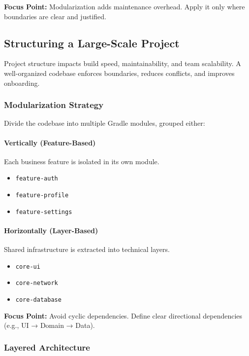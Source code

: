 \documentclass[a4paper,12pt]{article}
\begin{document}
\textbf{Focus Point:} Modularization adds maintenance overhead. Apply it only where boundaries are clear and justified.

\subsection{Structuring a Large-Scale Project}

Project structure impacts build speed, maintainability, and team scalability. A well-organized codebase enforces boundaries, reduces conflicts, and improves onboarding.

\subsubsection{Modularization Strategy}

Divide the codebase into multiple Gradle modules, grouped either:

\paragraph{Vertically (Feature-Based)}

Each business feature is isolated in its own module.

\begin{itemize}
  \item \texttt{feature-auth}
  \item \texttt{feature-profile}
  \item \texttt{feature-settings}
\end{itemize}

\paragraph{Horizontally (Layer-Based)}

Shared infrastructure is extracted into technical layers.

\begin{itemize}
  \item \texttt{core-ui}
  \item \texttt{core-network}
  \item \texttt{core-database}
\end{itemize}

\textbf{Focus Point:} Avoid cyclic dependencies. Define clear directional dependencies (e.g., UI → Domain → Data).

\subsubsection{Layered Architecture}
\end{document}
